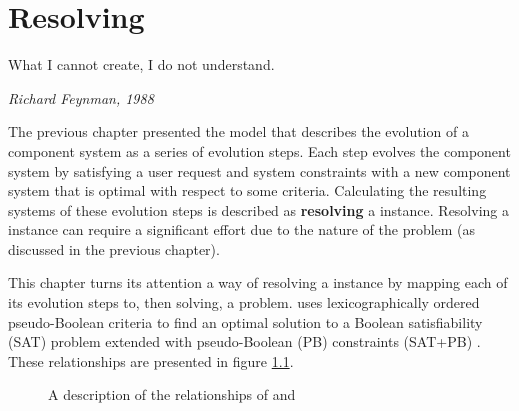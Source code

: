 \chapter{Resolving \modelname}
\label{implementation}
\epigraph{What I cannot create, I do not understand.}
{\textit{Richard Feynman, 1988}}
The previous chapter presented the \modelname model that describes the evolution of a component system as a series of evolution steps.
Each step evolves the component system by satisfying a user request and system constraints with a new component system that is optimal with respect to some criteria.
Calculating the resulting systems of these evolution steps is described as \textbf{resolving} a \modelname instance.
Resolving a \modelname instance can require a significant effort due to the nature of the problem (as discussed in the previous chapter).

This chapter turns its attention a way of resolving a \modelname instance by mapping each of its evolution steps to, then solving, a \modelimpl problem.
\modelimpl uses lexicographically ordered pseudo-Boolean criteria 
to find an optimal solution to a Boolean satisfiability (SAT) problem extended with pseudo-Boolean (PB) constraints (SAT+PB) \citep{dixon2004automating}.
These relationships are presented in figure \ref{impl.modelsatdiagram}.

\begin{figure}[htp]
\begin{center}
  \caption{A description of the relationships of \modelimpl and \modelname}
  \label{impl.modelsatdiagram}
\end{center}
\end{figure}

